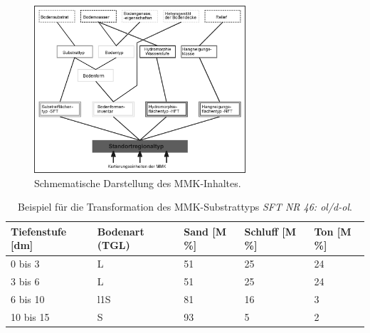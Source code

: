 \begin{figure}[t]
\centering\includegraphics[width=0.7\textwidth]{figures/MMK_Struktur}
\caption{Schmematische Darstellung des MMK-Inhaltes.}\label{fig:mmk-struktur}
\end{figure}

\begin{table}[t]
  \centering
  \caption{Beispiel für die Transformation des MMK-Substrattyps \textit{SFT NR 46: ol/d-ol}.}\label{tab:tans-mmk}
	\vspace*{6pt}
    \begin{tabularx}{\textwidth}{X|X|X|X|X}
    \toprule
    \textbf{Tiefenstufe [dm]} & \textbf{Bodenart (TGL)} & \textbf{Sand [M\,\%]} & \textbf{Schluff [M\,\%]} & \textbf{Ton [M\,\%]} \\
    \midrule
  0 bis 3 & L & 51 & 25 & 24 \\\midrule
    3 bis 6 & L & 51 & 25 & 24 \\\midrule
    6 bis 10 & l1S & 81 & 16 & 3 \\\midrule
    10 bis 15 & S & 93 & 5 & 2 \\
    \bottomrule
    \end{tabularx}%
  \label{tab:addlabel}%
\end{table}%

